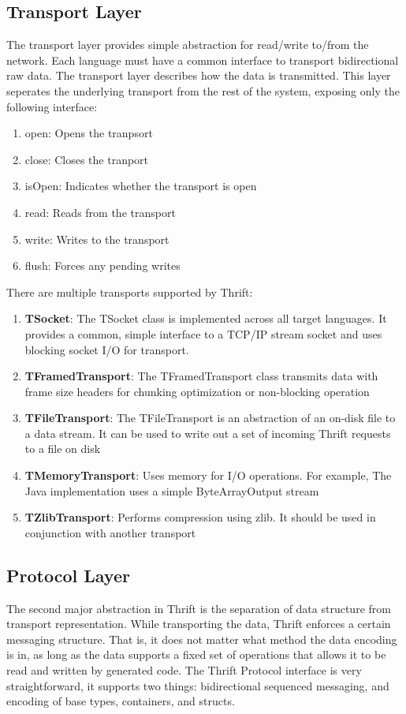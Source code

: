 \documentclass[9pt,twocolumn,twoside]{../../styles/osajnl}
\begin{document}
\subsection{Transport Layer}
The transport layer provides simple abstraction for read/write to/from the network. Each language must have a common interface to transport bidirectional raw data. The transport layer describes how the data is transmitted. This layer seperates the underlying transport from the rest of the system, exposing only the following interface:
\begin{enumerate}
	\item open: Opens the tranpsort
	\item close: Closes the tranport
	\item isOpen: Indicates whether the transport is open
	\item read: Reads from the transport
	\item write: Writes to the transport
	\item flush: Forces any pending writes\\
\end{enumerate}
There are multiple transports supported by Thrift:
\begin{enumerate}
	\item \textbf{TSocket}: The TSocket class is implemented across all target languages. It provides a common, simple interface to a TCP/IP stream socket and uses blocking socket I/O for transport.
	\item \textbf{TFramedTransport}: The TFramedTransport class transmits data with frame size headers for chunking optimization or non-blocking operation
	\item \textbf{TFileTransport}: The TFileTransport is an abstraction of an on-disk file to a data stream. It can be used to write out a set of incoming Thrift requests to a file on disk
	\item \textbf{TMemoryTransport}: Uses memory for I/O operations. For example, The Java implementation uses a simple ByteArrayOutput stream
	\item \textbf{TZlibTransport}: Performs compression using zlib. It should be used in conjunction with another transport
\end{enumerate}

\subsection{Protocol Layer}
The second major abstraction in Thrift is the separation of data structure from transport representation. While transporting the data, Thrift enforces a certain messaging structure. That is, it does not matter what method the data encoding is in, as long as the data supports a fixed set of operations that allows it to be read and written by generated code. The Thrift Protocol interface is very straightforward, it supports two things: bidirectional sequenced messaging, and encoding of base types, containers, and structs.
\end{document}
